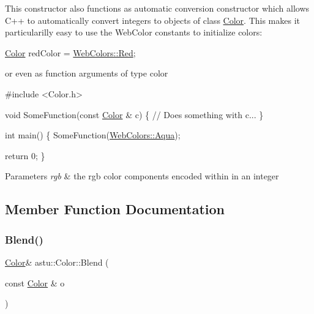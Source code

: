 This constructor also functions as automatic conversion constructor which allows C++ to automatically convert integers to objects of class \hyperlink{classastu_1_1Color}{Color}. This makes it particularilly easy to use the Web\+Color constants to initialize colors\+:


\begin{DoxyCode}
\hyperlink{classastu_1_1Color_a3b4505ef24790685a5e22bde22ff5b05}{Color} redColor = \hyperlink{group__gfx__group_gga6f6f9db1751e96b647084ecaedff2409a4f06dbd0c0981a97dd9279788b11a457}{WebColors::Red};
\end{DoxyCode}


or even as function arguments of type color


\begin{DoxyCode}
\textcolor{preprocessor}{#include <Color.h>}

\textcolor{keywordtype}{void} SomeFunction(\textcolor{keyword}{const} \hyperlink{classastu_1_1Color_a3b4505ef24790685a5e22bde22ff5b05}{Color} & c) \{
 \textcolor{comment}{// Does something with c...}
\}

\textcolor{keywordtype}{int} main() \{
  SomeFunction(\hyperlink{group__gfx__group_gga6f6f9db1751e96b647084ecaedff2409a3a60a96de57d7343338c0e5b282add56}{WebColors::Aqua});

  \textcolor{keywordflow}{return} 0;
\}
\end{DoxyCode}



\begin{DoxyParams}{Parameters}
{\em rgb} & the rgb color components encoded within in an integer \\
\hline
\end{DoxyParams}


\subsection{Member Function Documentation}
\mbox{\label{classastu_1_1Color_a3e246cf7b52ffda0f76a4fa0e7810763}} 
\subsubsection{\texorpdfstring{Blend()}{Blend()}}
{\footnotesize\ttfamily \hyperlink{classastu_1_1Color}{Color}\& astu\+::\+Color\+::\+Blend (\begin{DoxyParamCaption}\item[{const \hyperlink{classastu_1_1Color}{Color} \&}]{o }\end{DoxyParamCaption})}

